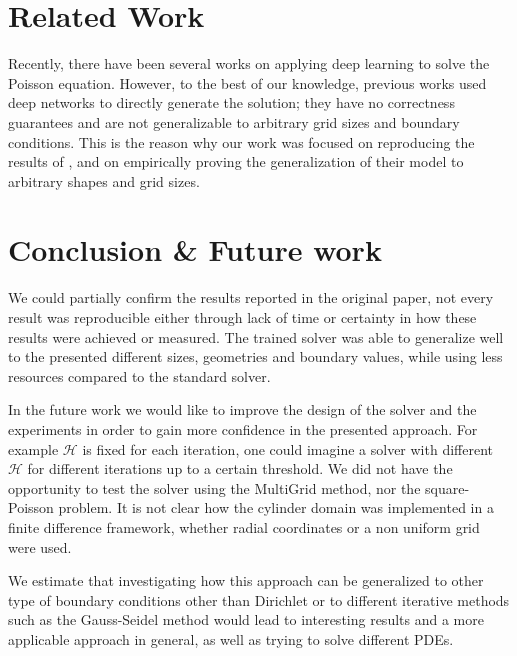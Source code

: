 \documentclass{rescience} %
\begin{document}
\FloatBarrier
\section{Related Work}
Recently, there have been several works on applying deep learning to solve the Poisson equation. However, to the best of our knowledge, previous works used deep networks to directly generate the solution; they have no correctness guarantees and are not generalizable to arbitrary grid sizes and
boundary conditions. This is the reason why our work was focused on reproducing the results of \cite{original_paper}, and on empirically proving the generalization of their model to arbitrary shapes and grid sizes.
\section{Conclusion \& Future work}

We could partially confirm the results reported in the original paper, not every result was reproducible either through lack of time or certainty in how these results were achieved or measured. The trained solver was able to generalize well to the presented different sizes, geometries and boundary values, while using less resources compared to the standard solver.

In the future work we would like to improve the design of the solver and the experiments in order to gain more confidence in the presented approach. For example $\mathcal{H}$ is fixed for each iteration, one could imagine a solver with different $\mathcal{H}$ for different iterations up to a certain threshold. We did not have the opportunity to test the solver using the MultiGrid method, nor the square-Poisson problem.
It is not clear how the cylinder domain was implemented in a finite difference framework, whether radial coordinates or a non uniform grid were used.

We estimate that investigating how this approach can be generalized to other type of boundary conditions other than Dirichlet or to different iterative methods such as the Gauss-Seidel method would lead to interesting results and a more applicable approach in general, as well as trying to solve different PDEs.

\setlength\bibitemsep{0pt}
\printbibliography
\end{document}
